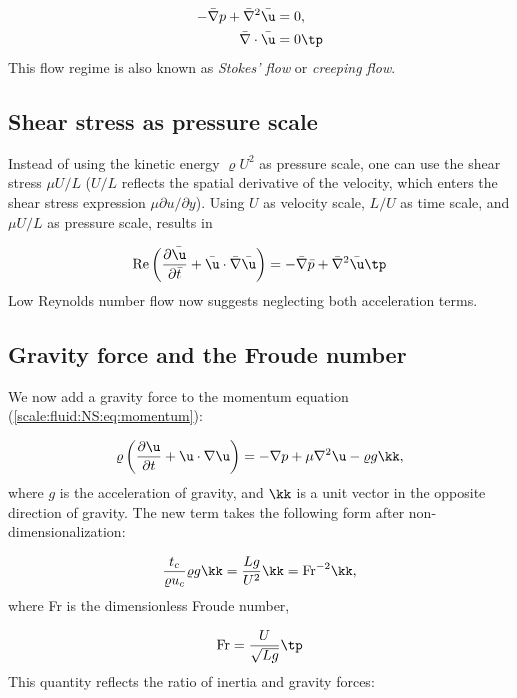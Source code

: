 \documentclass[graybox,envcountchap,sectrefs,final]{svmonodo}
\begin{document}
\begin{align}
-\bar\nabla p + \bar\nabla^2\bar\u &= 0,
\label{scale:fluid:NS:eq:momentum_d3}\\ 
\bar\nabla\cdot\bar\u &= 0\tp
\end{align}
This flow regime is also known as \emph{Stokes' flow} or \emph{creeping flow}.


\subsection{Shear stress as pressure scale}

Instead of using the kinetic energy $\varrho U^2$ as pressure scale,
one can use the shear stress $\mu U/L$ ($U/L$ reflects the spatial
derivative of the velocity, which enters the shear stress expression
$\mu\partial u/\partial y$). Using $U$ as velocity scale, $L/U$ as
time scale, and $\mu U/L$ as pressure scale, results in

\begin{equation}
\hbox{Re}\left(\frac{\partial \bar\u}{\partial \bar t} +
\bar\u\cdot\bar\nabla\bar\u\right)
= -\bar\nabla\bar p + \bar\nabla^2\bar\u\tp
\end{equation}
Low Reynolds number flow now suggests neglecting both acceleration terms.


\subsection{Gravity force and the Froude number}

We now add a gravity force to the momentum equation
(\ref{scale:fluid:NS:eq:momentum}):

\begin{equation}
\varrho\left(\frac{\partial \u}{\partial t} + \u\cdot\nabla\u\right)
= -\nabla p + \mu\nabla^2\u - \varrho g\kk,
\label{scale:fluid:NS:eq:momentum_g}
\end{equation}
where $g$ is the acceleration of gravity, and $\kk$ is a unit
vector in the opposite direction of gravity. The new term
takes the following form after non-dimensionalization:

\[ \frac{t_c}{\varrho  u_c}\varrho g \kk =  \frac{Lg}{U^2}\kk
= \hbox{Fr}^{-2}\kk,\]
where Fr is the dimensionless Froude number,

\[ \hbox{Fr} = \frac{U}{\sqrt{Lg}}\tp\]
This quantity reflects the ratio of inertia and gravity forces:
\end{document}
